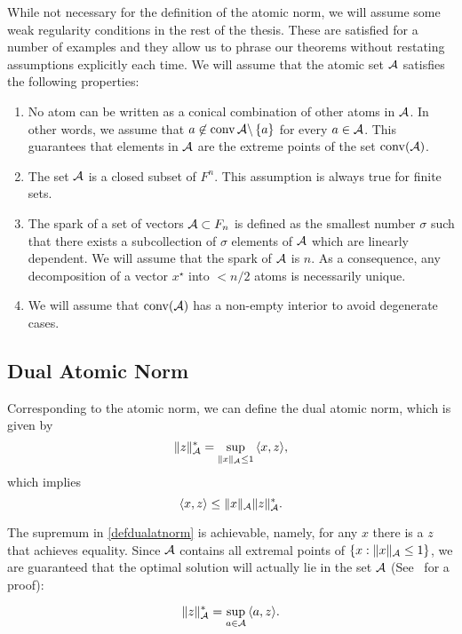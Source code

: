 While not necessary for the definition of the atomic norm, we will assume some
weak regularity conditions in the rest of the thesis. These are satisfied for a
number of examples and they allow us to phrase our theorems without restating
assumptions explicitly each time. We will assume that the atomic set $\mathcal{A}$ satisfies the following properties:
\begin{enumerate}
	\item No atom can be written as a conical combination of other atoms in 		$\mathcal{A}$. In other words, we assume that $ a \not\in \operatorname{conv}{\mathcal{A} \backslash \left\{ a \right\}}$ for every $a \in \mathcal{A}$. This guarantees that elements in $\mathcal{A}$ are the extreme points of the set $\operatorname{conv}(\mathcal{A})$.
	\item The set $\mathcal{A}$ is a closed subset of $F^n$. This assumption is always true for finite sets.
	\item The spark of a set of vectors $\mathcal{A} \subset F_n$ is defined as the smallest number $\sigma$ such that there exists a subcollection of $\sigma$ elements of $\mathcal{A}$ which are linearly dependent. We will assume that the spark of $\mathcal{A}$ is $n$. As a consequence, any decomposition of a vector $x^\star$ into $<n/2$ atoms is necessarily unique.~\cite{spark}
	\item We will assume that $\operatorname{conv}(\mathcal{A})$ has a non-empty interior to avoid degenerate cases.
\end{enumerate}


\subsection{Dual Atomic Norm}

Corresponding to the atomic norm, we can define the dual atomic norm, which is given by
\begin{equation}
  \label{defdualatnorm}
  \lVert z\rVert_{\mathcal{A}}^* = \sup_{\lVert x\rVert_{\mathcal{A}} \leq 1}{\langle x, z\rangle},
\end{equation}
which implies
\begin{equation}
  \label{holder}
  \langle x, z\rangle \leq \lVert x\rVert_{\mathcal{A}} \lVert z\rVert_{\mathcal{A}}^*.
\end{equation}

The supremum in \eqref{defdualatnorm} is achievable, namely, for any $x$ there
is a $z$ that achieves equality. Since $\mathcal{A}$ contains all extremal points of
$\{x: \|x\|_{\mathcal{A}} \leq 1\}$, we are guaranteed that the optimal solution will
actually lie in the set $\mathcal{A}$ (See~\cite{bonsall} for a proof):

\begin{equation}
\lVert z\rVert_{\mathcal{A}}^* = \sup_{a \in \mathcal{A}}{\langle a, z\rangle}.\label{bonsall}
\end{equation}


